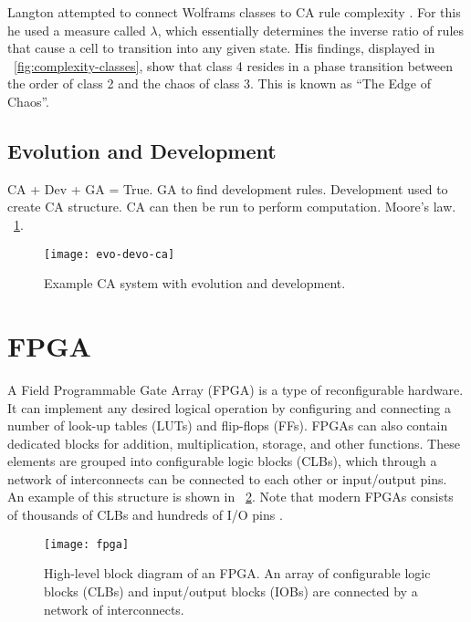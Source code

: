 Langton attempted to connect Wolframs classes to CA rule complexity \cite{langton1990edgeofchaos}.
For this he used a measure called $\lambda$, which essentially determines the inverse ratio of rules that cause a cell to transition into any given state.
His findings, displayed in \figurename~\ref{fig:complexity-classes}, show that class 4 resides in a phase transition between the order of class 2 and the chaos of class 3.
This is known as ``The Edge of Chaos''.

\subsection{Evolution and Development}

\TODO
CA + Dev + GA = True.
GA to find development rules.
Development used to create CA structure.
CA can then be run to perform computation.
Moore's law.
\figurename~\ref{fig:evo-devo-ca}.

\begin{figure}[!ht]
    \centering
    \texttt{[image: evo-devo-ca]}
    \caption[CA system with evolution and development]{
        Example CA system with evolution and development.
    }
    \label{fig:evo-devo-ca}
\end{figure}


\section{FPGA}

A Field Programmable Gate Array (FPGA) is a type of reconfigurable hardware.
It can implement any desired logical operation by configuring and connecting a number of look-up tables (LUTs) and flip-flops (FFs).
FPGAs can also contain dedicated blocks for addition, multiplication, storage, and other functions.
These elements are grouped into configurable logic blocks (CLBs), which through a network of interconnects can be connected to each other or input/output pins.
An example of this structure is shown in \figurename~\ref{fig:fpga}.
Note that modern FPGAs consists of thousands of CLBs and hundreds of I/O pins \cite{ds160}.

\begin{figure}[!ht]
    \centering
    \texttt{[image: fpga]}
    \caption[FPGA]{
        High-level block diagram of an FPGA.
        An array of configurable logic blocks (CLBs) and input/output blocks (IOBs) are connected by a network of interconnects.
    }
    \label{fig:fpga}
\end{figure}

